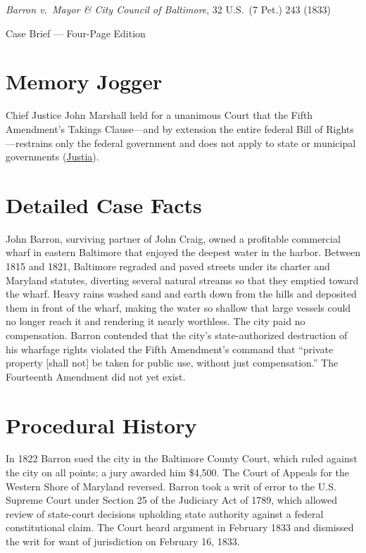 \documentclass[12pt]{article}
\begin{document}
\begin{center}
{\LARGE \textit{Barron v.\ Mayor \& City Council of Baltimore}, 32 U.S.\ (7 Pet.) 243 (1833)\par}
\vspace{0.8em}
{\large Case Brief --- Four-Page Edition\par}
\end{center}
\vspace{1em}

\section{Memory Jogger}

Chief Justice John Marshall held for a unanimous Court that the Fifth Amendment's Takings Clause---and by extension the entire federal Bill of Rights---restrains only the federal government and does not apply to state or municipal governments (\href{https://supreme.justia.com/cases/federal/us/32/243/}{Justia}).

\section{Detailed Case Facts}

John Barron, surviving partner of John Craig, owned a profitable commercial wharf in eastern Baltimore that enjoyed the deepest water in the harbor. Between 1815 and 1821, Baltimore regraded and paved streets under its charter and Maryland statutes, diverting several natural streams so that they emptied toward the wharf. Heavy rains washed sand and earth down from the hills and deposited them in front of the wharf, making the water so shallow that large vessels could no longer reach it and rendering it nearly worthless. The city paid no compensation. Barron contended that the city's state-authorized destruction of his wharfage rights violated the Fifth Amendment's command that ``private property [shall not] be taken for public use, without just compensation.'' The Fourteenth Amendment did not yet exist.

\section{Procedural History}

In 1822 Barron sued the city in the Baltimore County Court, which ruled against the city on all points; a jury awarded him \$4,500. The Court of Appeals for the Western Shore of Maryland reversed. Barron took a writ of error to the U.S. Supreme Court under Section 25 of the Judiciary Act of 1789, which allowed review of state-court decisions upholding state authority against a federal constitutional claim. The Court heard argument in February 1833 and dismissed the writ for want of jurisdiction on February 16, 1833.
\end{document}

